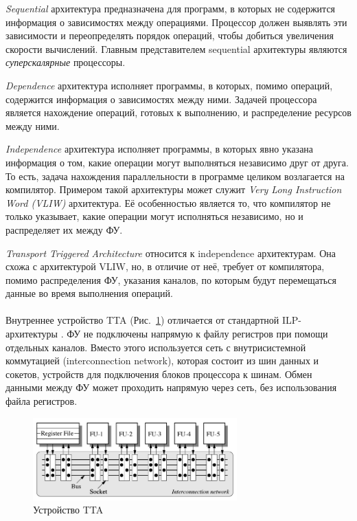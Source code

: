 \documentclass{matmex-diploma-custom}
\begin{document}
\textit{Sequential} архитектура предназначена для программ, в которых не содержится информация о зависимостях между операциями. Процессор должен выявлять эти зависимости и переопределять порядок операций, чтобы добиться увеличения скорости вычислений. Главным представителем sequential архитектуры являются \textit{суперскалярные} процессоры.

\textit{Dependence} архитектура исполняет программы, в которых, помимо операций, содержится информация о зависимостях между ними. Задачей процессора является нахождение операций, готовых к выполнению, и распределение ресурсов между ними. 

\textit{Independence} архитектура исполняет программы, в которых явно указана информация о том, какие операции могут выполняться независимо друг от друга. То есть, задача нахождения параллельности в программе целиком возлагается на компилятор. Примером такой архитектуры может служит \textit{Very Long Instruction Word (VLIW)} архитектура. Её особенностью является то, что компилятор не только указывает, какие операции могут исполняться независимо, но и распределяет их между ФУ. 

\textit{Transport Triggered Architecture} относится к independence архитектурам. Она схожа с архитектурой VLIW, но, в отличие от неё, требует от компилятора, помимо распределения ФУ, указания каналов, по которым будут перемещаться данные во время выполнения операций. 
\\ \\

Внутреннее устройство TTA (Рис.~\ref{tta}) отличается от стандартной ILP-архитектуры \cite{tta}. ФУ не подключены напрямую к файлу регистров при помощи отдельных каналов. Вместо этого используется сеть с внутрисистемной коммутацией (interconnection network), которая состоит из шин данных и сокетов, устройств для подключения блоков процессора к шинам. Обмен данными между ФУ может проходить напрямую через сеть, без использования файла регистров.

\begin{figure}[h]
    \centering
    \includegraphics[width=0.7\textwidth]{tta.png}
    \caption{Устройство TTA \cite{tta}}
    \label{tta}
\end{figure}
\end{document}

